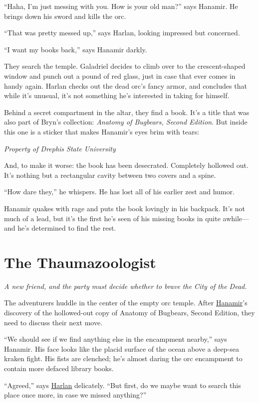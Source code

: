 \documentclass[smalldemyvopaper,11pt,twoside,onecolumn,openright,extrafontsizes]{memoir}
\newcommand{\chapdesc}[1]{
    \begin{flushright}
    \emph{{#1}}
    \end{flushright}
    \vspace{26pt}
}
\begin{document}
``Haha, I'm just messing with you. How is your old man?'' says Hanamir.
He brings down his sword and kills the orc.

``That was pretty messed up,'' says Harlan, looking impressed but
concerned.

``I want my books back,'' says Hanamir darkly.

They search the temple. Galadriel decides to climb over to the
crescent-shaped window and punch out a pound of red glass, just in case
that ever comes in handy again. Harlan checks out the dead orc's fancy
armor, and concludes that while it's unusual, it's not something he's
interested in taking for himself.

Behind a secret compartment in the altar, they find a book. It's a title
that was also part of Bryn's collection: \emph{Anatomy of Bugbears,
Second Edition}. But inside this one is a sticker that makes Hanamir's
eyes brim with tears:

\emph{Property of Drephis State University}

And, to make it worse: the book has been desecrated. Completely hollowed
out. It's nothing but a rectangular cavity between two covers and a
spine.

``How dare they,'' he whispers. He has lost all of his earlier zest and
humor.

Hanamir quakes with rage and puts the book lovingly in his backpack.
It's not much of a lead, but it's the first he's seen of his missing
books in quite awhile---and he's determined to find the rest.


\chapter{The Thaumazoologist}
\chapdesc{A new friend, and the party must decide whether to brave the City of the Dead.}

The adventurers huddle in the center of the empty orc temple. After
\href{/characters/hanamir/}{Hanamir}'s discovery of the hollowed-out
copy of Anatomy of Bugbears, Second Edition, they need to discuss their
next move.

``We should see if we find anything else in the encampment nearby,''
says Hanamir. His face looks like the placid surface of the ocean above
a deep-sea kraken fight. His fists are clenched; he's almost daring the
orc encampment to contain more defaced library books.

``Agreed,'' says \href{/characters/harlan/}{Harlan} delicately. ``But
first, do we maybe want to search this place once more, in case we
missed anything?''
\end{document}
